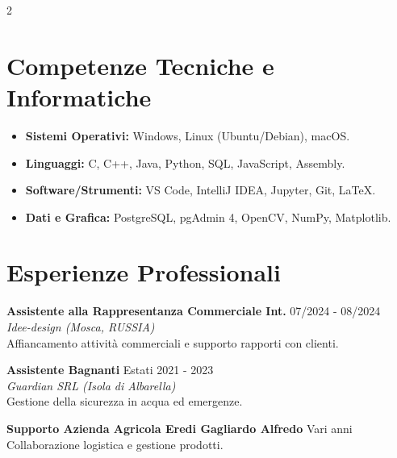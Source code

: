 \documentclass[10pt,a4paper]{article}
\begin{document}
\begin{paracol}{2}
\section*{Competenze Tecniche e Informatiche}
\begin{itemize}[leftmargin=*, noitemsep]
    \item \textbf{Sistemi Operativi:} Windows, Linux (Ubuntu/Debian), macOS.
    \item \textbf{Linguaggi:} C, C++, Java, Python, SQL, JavaScript, Assembly.
    \item \textbf{Software/Strumenti:} VS Code, IntelliJ IDEA, Jupyter, Git, LaTeX.
    \item \textbf{Dati e Grafica:} PostgreSQL, pgAdmin 4, OpenCV, NumPy, Matplotlib.
\end{itemize}

\section*{Esperienze Professionali}
\textbf{Assistente alla Rappresentanza Commerciale Int.} \hfill 07/2024 - 08/2024 \\
\textit{Idee-design (Mosca, RUSSIA)} \\
Affiancamento attività commerciali e supporto rapporti con clienti.

\vspace{2mm}
\textbf{Assistente Bagnanti} \hfill Estati 2021 - 2023 \\
\textit{Guardian SRL (Isola di Albarella)} \\
Gestione della sicurezza in acqua ed emergenze.

\vspace{2mm}
\textbf{Supporto Azienda Agricola Eredi Gagliardo Alfredo} \hfill Vari anni \\
Collaborazione logistica e gestione prodotti.

\end{paracol}
\end{document}
